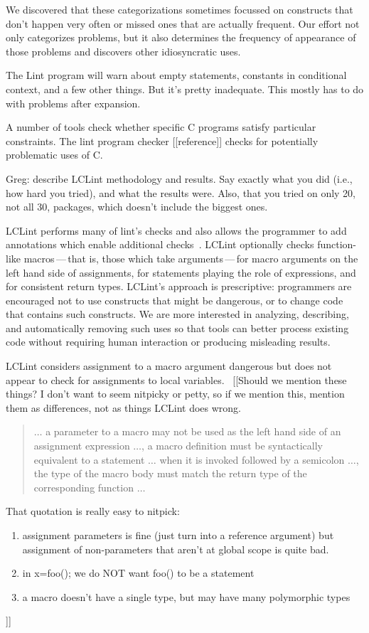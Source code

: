 \documentclass[10pt]{article}
\begin{document}
We discovered that these categorizations sometimes focussed on constructs
that don't happen very often or missed ones that are actually frequent.
Our effort not only categorizes problems, but it also determines the
frequency of appearance of those problems and discovers other idiosyncratic
uses.

The Lint program will warn about empty statements, constants in conditional
context, and a few other things.  But it's pretty inadequate.  This mostly
has to do with problems after expansion.

A number of tools check whether specific C programs satisfy particular
constraints.  The lint program checker [[reference]]
checks for potentially problematic uses of C\@.  



Greg:  describe LCLint methodology and results.  Say exactly what you did
(i.e., how hard you tried), and what the results were.  Also, that you tried
on only 20, not all 30, packages, which doesn't include the biggest ones.


LCLint performs many of lint's checks and also
allows the programmer to add annotations which enable additional
checks~\cite{Evans-fse94}.
LCLint optionally checks function-like
macros\,---\,that is, those which take arguments\,---\,for
macro arguments on the left hand side of assignments, for statements
playing the role of expressions, and for consistent return types.
LCLint's approach is prescriptive: programmers are encouraged not to use
constructs that might be dangerous, or to change code that contains such
constructs.  We are more interested in analyzing, describing, and
automatically removing such uses so that tools can better process existing
code without requiring human interaction or producing misleading results.

LCLint
considers assignment to a macro argument dangerous but does not appear
to check for assignments to local variables.~\cite[\S 8]{Evans:LCLint}
[[Should we mention these things?  I don't want to seem nitpicky or petty, so
if we mention this, mention them as differences, not as things LCLint does
wrong.
\begin{quote}
$\ldots$ a parameter to a macro may not be used as the left hand side
of an assignment expression $\ldots$, a macro definition must be
syntactically equivalent to a statement $\ldots$ when it is invoked followed by
a semicolon $\ldots$, the type of the macro body must match the return
type of the corresponding function $\ldots$~\cite[\S 8]{Evans:LCLint}
\end{quote}
That quotation is really easy to nitpick:
\begin{enumerate}
 \item assignment parameters is fine (just turn into a reference argument) but
    assignment of non-parameters that aren't at global scope is quite bad.
 \item in x=foo(); we do NOT want foo() to be a statement
 \item a macro doesn't have a single type, but may have many polymorphic types
\end{enumerate}
]]
\end{document}
